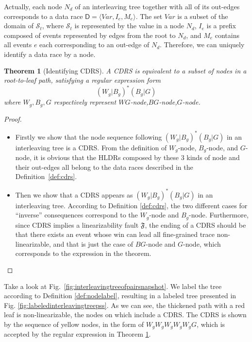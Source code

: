 \documentclass[runningheads]{llncs}
\newcommand{\pair}[1]{{\langle{#1}\rangle}}
\newcommand{\se}{\mathit{I_e}}
\newcommand{\ce}{\mathit{M_e}}
\newtheorem{myTheo}{Theorem}
\begin{document}
Actually, each node $N_d$ of an interleaving tree together with all of its out-edges corresponds to a data race $\mathsf{D} = \pair{\mathit{Var}, \se,\ce}$. The set $\mathit{Var}$ is a subset of the domain of $\mathcal{S}_t$, where $\mathcal{S}_t$ is represented by the value in a node $N_d$, $\se$ is a prefix composed of events represented by edges from the root to $N_d$, and $\ce$ contains all events $e$ each corresponding to an out-edge of $N_d$. Therefore, we can uniquely identify a data race by a node.

\begin{myTheo}[Identifying CDRS]\label{theo:idenfycdrs}
    A CDRS is equivalent to a subset of nodes in a root-to-leaf path, satisfying a regular expression form
    $$(W_g|B_g)^*(B_g|G)$$
    where $W_g,B_g,G$ respectively represent $\mathit{WG}$-node,$\mathit{BG}$-node,$\mathit{G}$-node.
\end{myTheo}





\begin{proof}



\begin{itemize}
\item Firstly we show that the node sequence following $(W_g|B_g)^*(B_g|G)$ in an interleaving tree is a CDRS.
From the definition of $W_g$-node, $B_g$-node, and $G$-node, it is obvious that the HLDRs composed by these 3 kinds of node and their out-edges all belong to the
data races described in the Definition~\ref{def:cdrs}.

\item Then we show that a CDRS appears as $(W_g|B_g)^*(B_g|G)$ in an interleaving tree.
According to Definition \ref{def:cdrs}, the two different cases for ``inverse'' consequences correspond to 
the $W_g$-node and $B_g$-node. Furthermore, since CDRS implies a linearizability fault $\mathfrak{F}$, the ending of a CDRS 
should be that there exists an event whose win can lead all fine-grained trace non-linearizable, and that is just the case of $BG$-node 
and $G$-node, which corresponds to the expression in the theorem.
\end{itemize}
 
 \end{proof}








\begin{example}
Take a look at Fig.~\ref{fig:interleavingtreeofpairsnapshot}.  We label the tree according to Definition \ref{def:nodelabel}, resulting in a labeled tree presented in Fig. \ref{fig:labeledinterleavingtreepss}.  As we can see, the thickened path with a red leaf is non-linearizable, the nodes on which include a CDRS. The CDRS is shown by the sequence of yellow nodes, in the form of $\mathit{W_gW_gW_gW_gW_gG}$, which is accepted by the regular expression in Theorem \ref{theo:idenfycdrs}.

\end{example}
\end{document}
